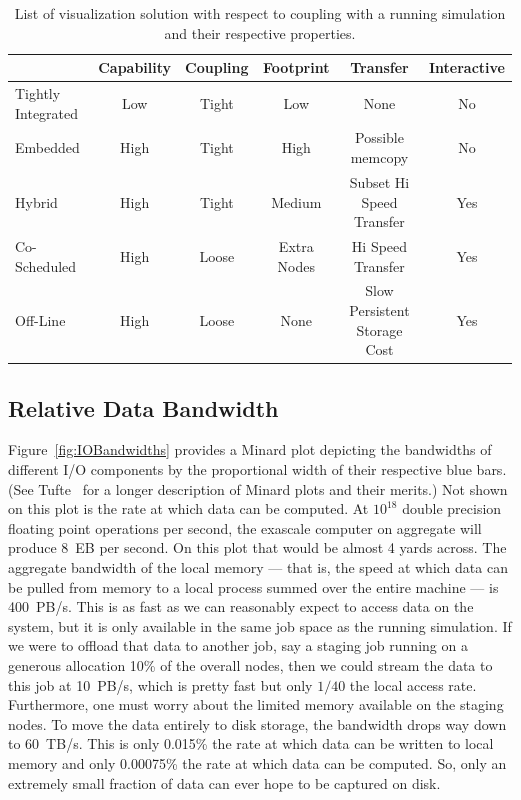 \documentclass[conference]{IEEEtran}
\newcommand*{\scite}[1]{~\cite{#1}}
\begin{document}
\begin{table}
  \centering
  \caption{List of visualization solution with respect to coupling with a
    running simulation and their respective properties.}
  \label{table:InSituSolutions}
  \begin{tabular}{@{}lccccc@{}}
    \toprule
    & Capability & Coupling & Footprint & Transfer & Interactive \\
    \midrule
    Tightly Integrated & Low & Tight & \textcolor{goodcolor}{Low} & \textcolor{goodcolor}{None} & No \\
    Embedded & \textcolor{goodcolor}{High} & Tight & High & Possible memcopy & No \\
    Hybrid & \textcolor{goodcolor}{High} & Tight & Medium & Subset Hi Speed Transfer & \textcolor{goodcolor}{Yes} \\
    Co-Scheduled & \textcolor{goodcolor}{High} & \textcolor{goodcolor}{Loose} & Extra Nodes & Hi Speed Transfer & \textcolor{goodcolor}{Yes} \\
    Off-Line & \textcolor{goodcolor}{High} & \textcolor{goodcolor}{Loose} & \textcolor{goodcolor}{None} & \textcolor{badcolor}{Slow Persistent Storage Cost} & \textcolor{goodcolor}{Yes} \\
    \bottomrule
  \end{tabular}
\end{table}

\subsection{Relative Data Bandwidth}

\noindent
Figure~\ref{fig:IOBandwidths} provides a Minard plot depicting the
bandwidths of different I/O components by the proportional width of their
respective blue bars.  (See Tufte\scite{Tufte2001} for a longer description
of Minard plots and their merits.)  Not shown on this plot is the rate at
which data can be computed.  At $10^{18}$ double precision floating point
operations per second, the exascale computer on aggregate will produce 8~EB
per second.  On this plot that would be almost 4 yards across.  The
aggregate bandwidth of the local memory --- that is, the speed at which
data can be pulled from memory to a local process summed over the entire
machine --- is 400~PB/s.  This is as fast as we can reasonably expect to
access data on the system, but it is only available in the same job space
as the running simulation.  If we were to offload that data to another job,
say a staging job running on a generous allocation 10\% of the overall
nodes, then we could stream the data to this job at 10~PB/s, which is
pretty fast but only $1/40$ the local access rate.  Furthermore, one must
worry about the limited memory available on the staging nodes.  To move the
data entirely to disk storage, the bandwidth drops way down to 60~TB/s.
This is only 0.015\% the rate at which data can be written to local memory
and only 0.00075\% the rate at which data can be computed.  So, only an
extremely small fraction of data can ever hope to be captured on disk.
\end{document}
